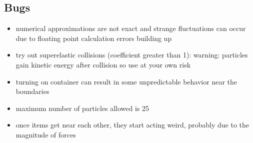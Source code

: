 \documentclass{article}
\begin{document}
\subsection*{Bugs}

\begin{itemize}
	\item numerical approximations are not exact and strange fluctuations can occur due to floating point calculation errors building up
	\item try out superelastic collisions (coefficient greater than 1): warning: particles gain kinetic energy after collision so use at your own risk
	\item turning on container can result in some unpredictable behavior near the boundaries
	\item maximum number of particles allowed is 25
	\item once items get near each other, they start acting weird, probably due to the magnitude of forces
\end{itemize}
\end{document}
